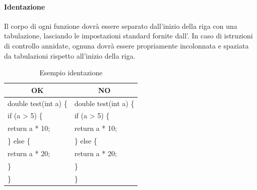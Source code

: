 \paragraph{Identazione}
Il corpo di ogni funzione dovrà essere separato dall’inizio della riga con una tabulazione, lasciando le impostazioni standard fornite dall’. In caso di istruzioni di controllo annidate, ognuna dovrà essere propriamente incolonnata e spaziata da tabulazioni rispetto all'inizio della riga.
\begin{table} [H]
	\begin{center}
		\begin{tabular}{ | l | l |}
			\multicolumn{1}{c}{\textbf{OK}}&\multicolumn{1}{c}{\textbf{NO}}\\ 
			\hline
			double test(int a) \{ & double test(int a) \{\\
			\hspace{0.5cm}if (a > 5) \{ 			   &  if (a > 5) \{\\
			\hspace{1cm}return a * 10;          & \hspace{0.5cm}return a * 10;\\
		    \hspace{0.5cm}\} else \{ 					& \} else \{\\
			\hspace{1cm}return a * 20;          & \hspace{0.5cm}return a * 20;\\
			\hspace{0.5cm}\}								& \}\\
			\}								& \}\\
			\hline
		\end{tabular}
	\end{center}
\caption{Esempio identazione}
\end{table}

